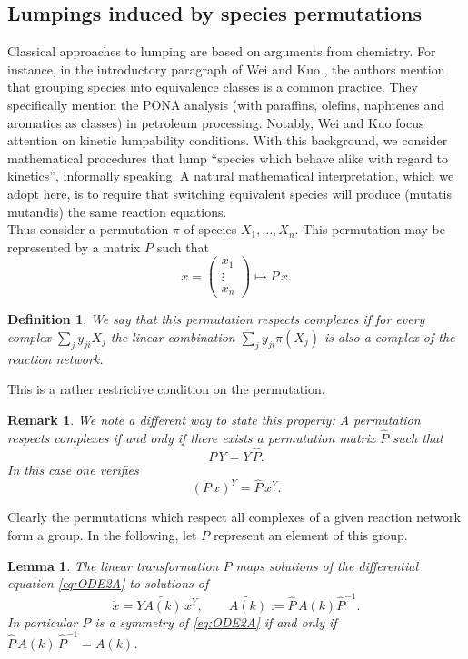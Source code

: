 \documentclass{article}
\newtheorem{remark}{Remark}
\newtheorem{definition}{Definition}
\newtheorem{lemma}{Lemma}
\begin{document}
\subsection{Lumpings induced by species permutations}
Classical approaches to lumping are based on arguments from chemistry. For instance, in the introductory paragraph of Wei and Kuo \cite{WK1969a}, the authors mention that grouping species into equivalence classes is a common practice. They specifically mention the PONA analysis (with paraffins, olefins, naphtenes and aromatics as classes) in petroleum processing. Notably, Wei and Kuo focus attention on kinetic lumpability conditions. With this background, we consider mathematical procedures that
lump ``species which behave alike with regard to kinetics'', informally speaking. A natural mathematical interpretation, which we adopt here, is to require that switching equivalent species will produce (mutatis mutandis) the same reaction equations.\\
Thus consider a permutation $\pi$ of species $X_1,\ldots,X_n$. This permutation may be represented by a matrix $P$ such that
\[
x=\begin{pmatrix} x_1\\ \vdots \\ x_n\end{pmatrix}\mapsto P\,x.
\]
\begin{definition}
    We say that this permutation respects complexes if for every complex $\sum_j y_{ji}X_j$ the linear combination $\sum_j y_{ji} \pi(X_j)$ is also a complex of the reaction network. 
\end{definition} 
This is a rather restrictive condition on the permutation. 
\begin{remark}
{\em    We note a different way to state this property: A permutation respects complexes if and only if there exists a permutation matrix $\widehat P$ such that 
\[
P\,Y=Y\,\widehat P.
\]
In this case one verifies 
\[
\left(P\,x\right)^Y= \widehat P\,x^Y.
\] 
}
\end{remark}
 Clearly the permutations which respect all complexes of a given reaction network form a group. In the following, let $P$ represent an element of this group.
\begin{lemma}
   The linear transformation $P$ maps solutions of the differential equation \eqref{eq:ODE2A} to solutions of  
   \begin{equation}\label{eq:ODE2B}
\dot{x}=  Y \widetilde{A(k)}\,  x^Y,\qquad \widetilde{A(k)}:=\widehat P\,A(k){\widehat P}^{-1}.
\end{equation}
 In particular $P$ is a symmetry of \eqref{eq:ODE2A} if and only if $\widehat P \,A(k)\,{\widehat P}^{-1}=A(k)$. 
\end{lemma} 
\end{document}
